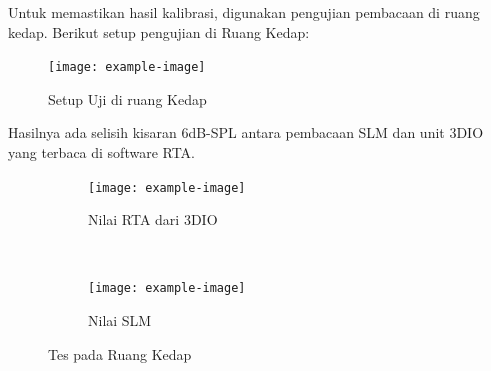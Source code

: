 \documentclass{article}
\begin{document}
	Untuk memastikan hasil kalibrasi, digunakan pengujian pembacaan di ruang kedap.
	Berikut setup pengujian di Ruang Kedap:
	
	\begin{figure}[H]
		\centering
		\texttt{[image: example-image]}
		\caption{Setup Uji di ruang Kedap}
	\end{figure}
	
	Hasilnya ada selisih kisaran 6dB-SPL antara pembacaan SLM dan unit 3DIO yang terbaca di software RTA.
	
	\begin{figure}[H]
		\centering
		\begin{subfigure}[]{.55\textwidth}
			\texttt{[image: example-image]}
			\caption{Nilai RTA dari 3DIO}
		\end{subfigure}
		\\
		\begin{subfigure}[]{.55\textwidth}
			\texttt{[image: example-image]}
			\caption{Nilai SLM}
		\end{subfigure}
		\caption{Tes pada Ruang Kedap}
	\end{figure}
\end{document}
